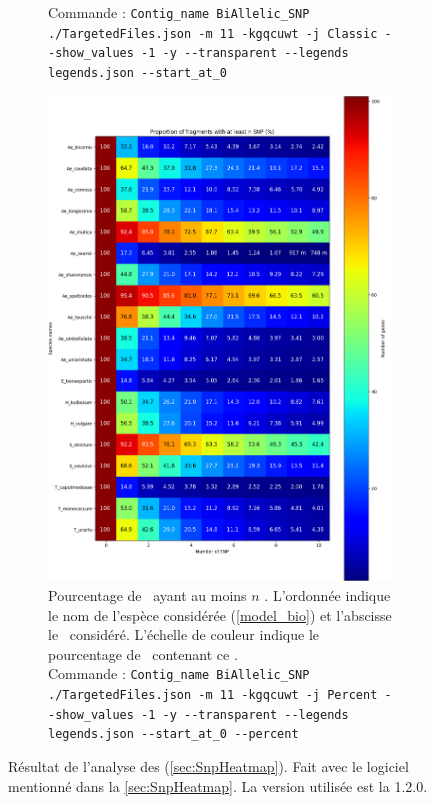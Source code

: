\documentclass[../main]{subfiles} %
\begin{document}
\begin{landscape}
\begin{figure}[p]
\begin{subfigure}[b]{0.55\paperwidth}
{        Commande : \lstinline{Contig_name BiAllelic_SNP ./TargetedFiles.json -m 11 -kgqcuwt -j Classic --show_values -1 -y --transparent --legends legends.json --start_at_0}  
        }
        \label{fig:ClassicSNPHeatmap}
    \end{subfigure}
    \hfill
    \begin{subfigure}[b]{0.55\paperwidth}
        \centering
        \includegraphics[width=\textwidth]{../Illustrations/Percent_Heatmap_SNP.png}
        \caption{Pourcentage de \contigs ayant au moins $n$ \SNP. L'ordonnée indique le nom de l'espèce considérée (\ref{model_bio}) et l'abscisse le \NbSNP considéré. L'échelle de couleur indique le pourcentage de \contigs contenant ce \NbSNP. \\
        Commande : \lstinline{Contig_name BiAllelic_SNP ./TargetedFiles.json -m 11 -kgqcuwt -j Percent --show_values -1 -y --transparent --legends legends.json --start_at_0 --percent}
        }
        \label{fig:PercentSNPHeatmap}
    \end{subfigure}
    
    \caption{Résultat de l'analyse des \SNP (\ref{sec:SnpHeatmap}). Fait avec le logiciel mentionné dans la \ref{sec:SnpHeatmap}. La version utilisée est la 1.2.0.}
    \label{fig:SNPHeatmap}
    
\end{figure}
\end{landscape}
\restoregeometry
\end{document}
